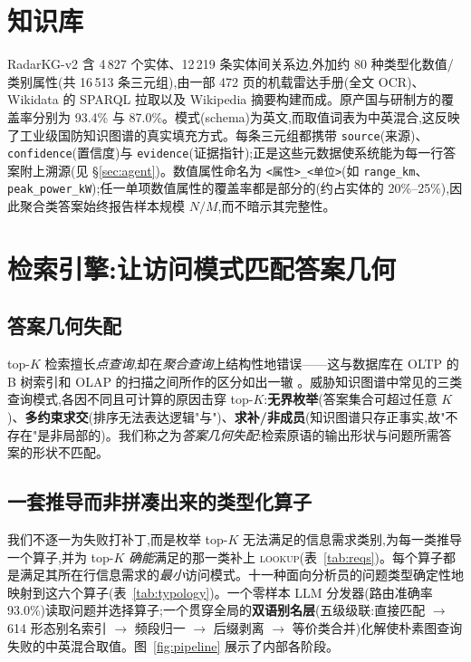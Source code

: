 \documentclass[11pt,a4paper]{article}
\newcommand{\op}[1]{\textsc{\small #1}}
\begin{document}
\section{知识库}
\label{sec:kg}

RadarKG-v2 含 4\,827 个实体、12\,219 条实体间关系边,外加约 80 种类型化数值/类别属性(共 16\,513 条三元组),由一部 472 页的机载雷达手册(全文 OCR)、Wikidata 的 SPARQL 拉取以及 Wikipedia 摘要构建而成。原产国与研制方的覆盖率分别为 93.4\% 与 87.0\%。模式(schema)为英文,而取值词表为中英混合,这反映了工业级国防知识图谱的真实填充方式。每条三元组都携带 \texttt{source}(来源)、\texttt{confidence}(置信度)与 \texttt{evidence}(证据指针);正是这些元数据使系统能为每一行答案附上溯源(见 \S\ref{sec:agent})。数值属性命名为 \texttt{<属性>\_<单位>}(如 \texttt{range\_km}、\texttt{peak\_power\_kW});任一单项数值属性的覆盖率都是部分的(约占实体的 20\%--25\%),因此聚合类答案始终报告样本规模 $N/M$,而不暗示其完整性。

\section{检索引擎:让访问模式匹配答案几何}
\label{sec:engine}

\subsection{答案几何失配}
top-$K$ 检索擅长\emph{点查询},却在\emph{聚合查询}上结构性地错误——这与数据库在 OLTP 的 B 树索引和 OLAP 的扫描之间所作的区分如出一辙 \citep{codd1970relational}。威胁知识图谱中常见的三类查询模式,各因不同且可计算的原因击穿 top-$K$:\textbf{无界枚举}(答案集合可超过任意 $K$)、\textbf{多约束求交}(排序无法表达逻辑"与")、\textbf{求补/非成员}(知识图谱只存正事实,故"不存在"是非局部的)。我们称之为\emph{答案几何失配}:检索原语的输出形状与问题所需答案的形状不匹配。

\subsection{一套推导而非拼凑出来的类型化算子}
我们不逐一为失败打补丁,而是枚举 top-$K$ 无法满足的信息需求类别,为每一类推导一个算子,并为 top-$K$ \emph{确能}满足的那一类补上 \op{lookup}(表~\ref{tab:reqs})。每个算子都是满足其所在行信息需求的\emph{最小}访问模式。十一种面向分析员的问题类型确定性地映射到这六个算子(表~\ref{tab:typology})。一个零样本 LLM 分发器(路由准确率 93.0\%)读取问题并选择算子;一个贯穿全局的\textbf{双语别名层}(五级级联:直接匹配 $\to$ 614 形态别名索引 $\to$ 频段归一 $\to$ 后缀剥离 $\to$ 等价类合并)化解使朴素图查询失败的中英混合取值。图~\ref{fig:pipeline} 展示了内部各阶段。
\end{document}
